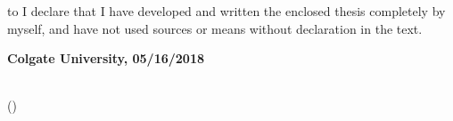 \documentclass[../thesis.tex]{subfiles}
\begin{document}
\thispagestyle{empty}
\null\vfill
\noindent\hbox to \textwidth{\hrulefill} 
I declare that I have developed and written the enclosed
thesis completely by myself, and have not used sources or means without
declaration in the text.
 
\textbf{Colgate University, 05/16/2018}
\vspace{1.5cm}
 
\dotfill\hspace*{8.0cm}\\
\hspace*{2cm}(\theauthor) 
\cleardoublepage
\end{document}
